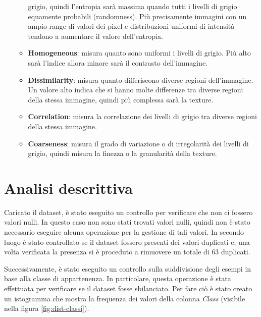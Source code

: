 \begin{enumerate}
\begin{itemize}
                        grigio, quindi l'entropia sarà massima quando tutti i
                        livelli di grigio equamente probabili (randomness). Più
                        precisamente immagini con un ampio range di valori dei
                        pixel e distribuzioni uniformi di intensità tendono a
                        aumentare il valore dell'entropia.
                  \item \textbf{Homogeneous}: misura quanto sono uniformi i
                        livelli di grigio. Più alto sarà l'indice allora minore
                        sarà il contrasto dell'immagine.
                  \item \textbf{Dissimilarity}: misura quanto differiscono
                        diverse regioni dell'immagine. Un valore alto indica che
                        si hanno molte differenze tra diverse regioni della
                        stessa immagine, quindi più complessa sarà la texture.
                  \item \textbf{Correlation}: misura la correlazione dei livelli
                        di grigio tra diverse regioni della stessa immagine.
                  \item \textbf{Coarseness}: misura il grado di variazione o di
                        irregolarità dei livelli di grigio, quindi misura la
                        finezza o la granularità della texture.
            \end{itemize}
\end{enumerate}
\section{Analisi descrittiva}\label{sec:analisi-descrittiva}
Caricato il dataset, è stato eseguito un controllo per verificare che non ci
fossero valori nulli. In questo caso non sono stati trovati valori nulli, quindi
non è stato necessario eseguire alcuna operazione per la gestione di tali valori.
In secondo luogo è stato controllato se il dataset fossero presenti dei valori
duplicati e, una volta verificata la presenza si è proceduto a rimuovere un
totale di $63$ duplicati.

Successivamente, è stato eseguito un controllo sulla suddivisione degli esempi
in base alla classe di appartenenza. In particolare, questa operazione è stata
effettuata per verificare se il dataset fosse sbilanciato. Per fare ciò è stato
creato un istogramma che mostra la frequenza dei valori della colonna
\textit{Class} (visibile nella figura \ref{fig:dist-classi}).

